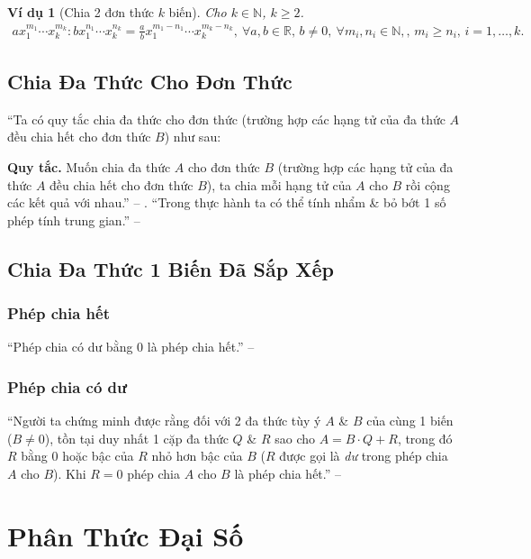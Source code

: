 \documentclass[oneside]{book}
\numberwithin{equation}{section}
\newtheorem{vidu}{Ví dụ}[section]
\begin{document}
\begin{vidu}[Chia 2 đơn thức $k$ biến]
	Cho $k\in\mathbb{N}$, $k\ge 2$.
	\begin{align*}
		ax_1^{m_1}\cdots x_k^{m_k}:bx_1^{n_1}\cdots x_k^{n_k} = \frac{a}{b}x_1^{m_1 - n_1}\cdots x_k^{m_k - n_k},\ \forall a,b\in\mathbb{R},\,b\ne 0,\ \forall m_i,n_i\in\mathbb{N},,\,m_i\ge n_i,\,i = 1,\ldots,k.
	\end{align*}
\end{vidu}

\section{Chia Đa Thức Cho Đơn Thức}
``Ta có quy tắc chia đa thức cho đơn thức (trường hợp các hạng tử của đa thức $A$ đều chia hết cho đơn thức $B$) như sau:

\textbf{Quy tắc.} Muốn chia đa thức $A$ cho đơn thức $B$ (trường hợp các hạng tử của đa thức $A$ đều chia hết cho đơn thức $B$), ta chia mỗi hạng tử của $A$ cho $B$ rồi cộng các kết quả với nhau.'' -- \cite[p. 27]{SGK_Toan_8_tap_1}. ``Trong thực hành ta có thể tính nhẩm \& bỏ bớt 1 số phép tính trung gian.'' -- \cite[p. 28]{SGK_Toan_8_tap_1}

\section{Chia Đa Thức 1 Biến Đã Sắp Xếp}

\subsection{Phép chia hết}
``Phép chia có dư bằng $0$ là phép chia hết.'' -- \cite[p. 30]{SGK_Toan_8_tap_1}

\subsection{Phép chia có dư}
``Người ta chứng minh được rằng đối với 2 đa thức tùy ý $A$ \& $B$ của cùng 1 biến ($B\ne 0$), tồn tại duy nhất 1 cặp đa thức $Q$ \& $R$ sao cho $A = B\cdot Q + R$, trong đó $R$ bằng 0 hoặc bậc của $R$ nhỏ hơn bậc của $B$ ($R$ được gọi là \textit{dư} trong phép chia $A$ cho $B$). Khi $R = 0$ phép chia $A$ cho $B$ là phép chia hết.'' -- \cite[p. 31]{SGK_Toan_8_tap_1}


\chapter{Phân Thức Đại Số}
\end{document}
